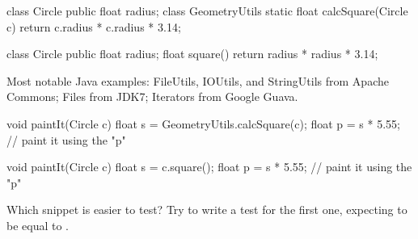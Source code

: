 \documentclass{article}
\begin{document}

\pptToc


\begin{pptWide}{2}
{\small\begin{ffcode}
class Circle {
  public float radius;
}
class GeometryUtils {
  static float calcSquare(Circle c) {
    return c.radius * c.radius * 3.14;
  }
}
\end{ffcode}
}
\par\columnbreak\par
{\small\begin{ffcode}
class Circle {
  public float radius;
  float square() {
    return radius * radius * 3.14;
  }
}
\end{ffcode}
}
\end{pptWide}\par
Most notable Java examples:
FileUtils, IOUtils, and StringUtils from Apache Commons;
Files from JDK7;
Iterators from Google Guava.
\plush{}


\begin{pptWide}{2}
{\small\begin{ffcode}
void paintIt(Circle c) {
  float s = GeometryUtils.calcSquare(c);
  float p = s * 5.55;
  // paint it using the "p"
}
\end{ffcode}
}
\par\columnbreak\par
{\small\begin{ffcode}
void paintIt(Circle c) {
  float s = c.square();
  float p = s * 5.55;
  // paint it using the "p"
}
\end{ffcode}
}
\end{pptWide}\par
Which snippet is easier to test? Try to write a test for the first one, expecting  to be equal to .
\plush{}

\plush{}

\plush{}
\end{document}
